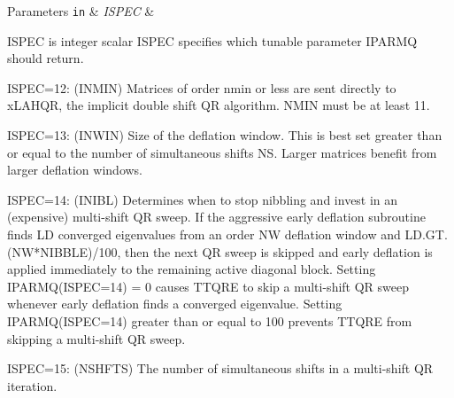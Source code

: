 \begin{DoxyParams}[1]{Parameters}
\mbox{\tt in}  & {\em I\+S\+P\+E\+C} & \begin{DoxyVerb}          ISPEC is integer scalar
              ISPEC specifies which tunable parameter IPARMQ should
              return.

              ISPEC=12: (INMIN)  Matrices of order nmin or less
                        are sent directly to xLAHQR, the implicit
                        double shift QR algorithm.  NMIN must be
                        at least 11.

              ISPEC=13: (INWIN)  Size of the deflation window.
                        This is best set greater than or equal to
                        the number of simultaneous shifts NS.
                        Larger matrices benefit from larger deflation
                        windows.

              ISPEC=14: (INIBL) Determines when to stop nibbling and
                        invest in an (expensive) multi-shift QR sweep.
                        If the aggressive early deflation subroutine
                        finds LD converged eigenvalues from an order
                        NW deflation window and LD.GT.(NW*NIBBLE)/100,
                        then the next QR sweep is skipped and early
                        deflation is applied immediately to the
                        remaining active diagonal block.  Setting
                        IPARMQ(ISPEC=14) = 0 causes TTQRE to skip a
                        multi-shift QR sweep whenever early deflation
                        finds a converged eigenvalue.  Setting
                        IPARMQ(ISPEC=14) greater than or equal to 100
                        prevents TTQRE from skipping a multi-shift
                        QR sweep.

              ISPEC=15: (NSHFTS) The number of simultaneous shifts in
                        a multi-shift QR iteration.


\end{DoxyVerb}
\end{DoxyParams}
